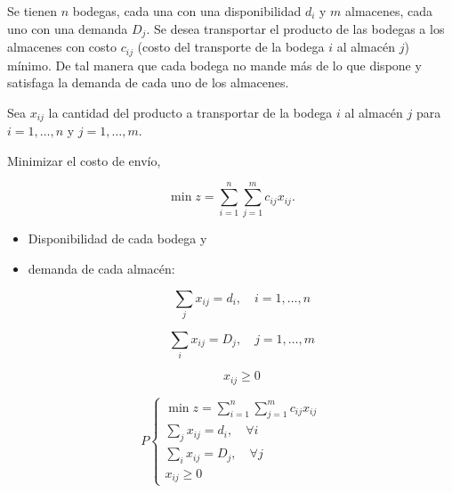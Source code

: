 \begin{Ejem} Se tienen $n$ bodegas, cada una con una disponibilidad $d_i$ y $m$ almacenes, cada uno con una demanda $D_j$. Se desea transportar el producto de las bodegas a los almacenes con costo $c_{ij}$ (costo del transporte de la bodega $i$ al almac\'en $j$) m\'inimo. De tal manera que cada bodega no mande m\'as de lo que dispone y satisfaga la demanda de cada uno de los almacenes.

\begin{tcolorbox}[title=Variables de decisi\'on.] Sea $x_{ij}$ la cantidad del producto a transportar de la bodega $i$ al almac\'en $j$ para $i = 1,\dots,n$ y $j = 1,\dots,m$.

\end{tcolorbox}

\begin{tcolorbox}[title=Funci\'on objetivo.] Minimizar el costo de env\'io,

\[
\min z = \sum_{i=1}^{n}\sum_{j=1}^{m} c_{ij}x_{ij}.
\]
\end{tcolorbox}

\begin{tcolorbox}[title=Restricciones.]
\begin{itemize}
\item[(a) ] Disponibilidad de cada bodega y  
\item[(b) ] demanda de cada almac\'en:

\[
\sum_{j} x_{ij} = d_i, \quad i = 1,\dots,n
\]

\[
\sum_{i} x_{ij} = D_j, \quad j = 1,\dots,m
\]

\[
x_{ij} \ge 0
\]
\end{itemize}
\end{tcolorbox}

\begin{tcolorbox}[title=Entonces el problema de transporte queda planteado de la siguiente manera:]
\[
P
\begin{cases}
\min z = \sum_{i=1}^{n}\sum_{j=1}^{m} c_{ij}x_{ij} \\
\sum_j x_{ij} = d_i, \quad \forall i \\
\sum_i x_{ij} = D_j, \quad \forall j \\
x_{ij} \ge 0
\end{cases}
\]
\end{tcolorbox}

\end{Ejem}

